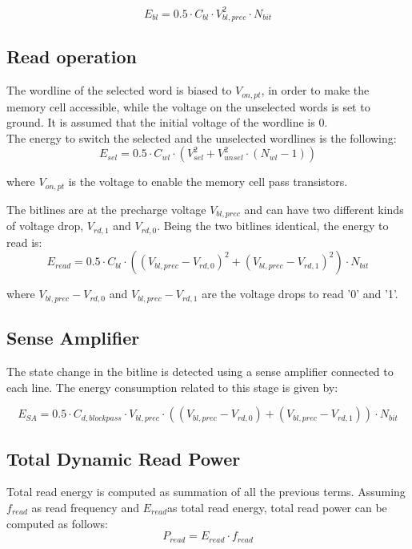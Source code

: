 \[
E_{bl}= 0.5 \cdot C_{bl} \cdot V_{bl,prec}^2 \cdot N_{bit}
\]

\subsection{Read operation}
\label{sec:read_op}

The wordline of the selected word is biased to $V_{on,pt}$, in order to make the memory cell accessible, while the voltage on the unselected words is set to ground. It is assumed that the initial voltage of the wordline is 0.\\

The energy to switch the selected and the unselected wordlines is the following:
\[
E_{sel}= 0.5 \cdot C_{wl} \cdot (V_{sel}^2+ V_{unsel}^2 \cdot (N_{wl}-1))
\]

where $V_{on,pt}$ is the voltage to enable the memory cell pass transistors.

The bitlines are at the precharge voltage $V_{bl,prec}$ and can have two different kinds of voltage drop, $V_{rd,1}$ and $V_{rd,0}$. 
Being the two bitlines identical, the energy to read is:
\[
E_{read}=0.5 \cdot C_{bl} \cdot ((V_{bl,prec}-V_{rd,0})^2 + (V_{bl,prec}-V_{rd,1})^2) \cdot N_{bit}
\]

where $V_{bl,prec}-V_{rd,0}$ and $V_{bl,prec}-V_{rd,1}$ are the voltage drops to read '0' and '1'.

\subsection{Sense Amplifier}
\label{sec:sense_amp}

The state change in the bitline is detected using a sense amplifier connected to each line.
The energy consumption related to this stage is given by:

\[
E_{SA}= 0.5 \cdot C_{d,blockpass} \cdot V_{bl,prec} \cdot ((V_{bl,prec}-V_{rd,0}) + (V_{bl,prec}-V_{rd,1})) \cdot N_{bit}
\]

\subsection{Total Dynamic Read Power}
\label{sec:total_power}

Total read energy is computed as summation of all the previous terms.
Assuming $f_{read}$ as read frequency and $E_{read}$as total read energy, total read power can be computed as follows:
\[
P_{read}=E_{read}\cdot f_{read}
\]

